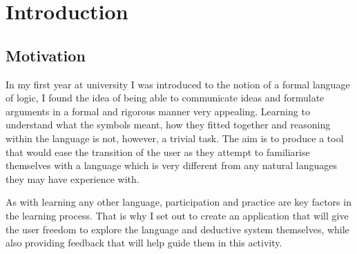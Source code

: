 \chapter{Introduction}


\section{Motivation}

In my first year at university I was introduced to the notion of a formal language of logic, I found the idea of being able to communicate ideas and formulate arguments in a formal and rigorous manner very appealing. Learning to understand what the symbols meant, how they fitted together and reasoning within the language is not, however, a trivial task. The aim is to produce a tool that would ease the transition of the user as they attempt to familiarise themselves with a language which is very different from any natural languages they may have experience with. 

As with learning any other language, participation and practice are key factors in the learning process. That is why I set out to create an application that will give the user freedom to explore the language and deductive system themselves, while also providing feedback that will help guide them in this activity.